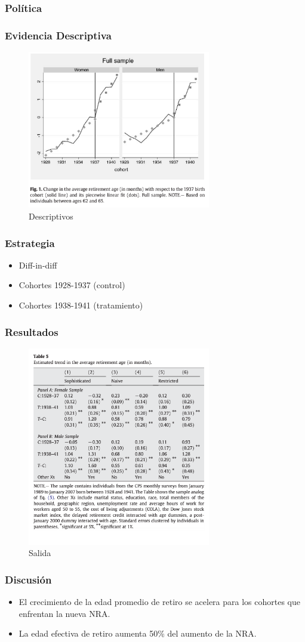 \documentclass{beamer}
\begin{document}
 
  \frame
  {
    \frametitle{Política}
  }
  \frame
  {
    \frametitle{Evidencia Descriptiva}
      \begin{figure}[htp]
        \centering
        \includegraphics[width=8cm]{imgs/mastrobouni-fig1}
        \caption{Descriptivos}
        \label{fig:fig2}
      \end{figure}
  }
  \frame
  {
    \frametitle{Estrategia}
    \begin{itemize}
      \item Diff-in-diff
      \item Cohortes 1928-1937 (control)
      \item Cohortes 1938-1941 (tratamiento)
    \end{itemize}
  }
  \frame
  {
    \frametitle{Resultados}
      \begin{figure}[htp]
        \centering
        \includegraphics[width=8cm]{imgs/mastrobouni-tab5}
        \caption{Salida}
        \label{fig:fig2}
      \end{figure}
  }
  \frame
  {
    \frametitle{Discusión}
    \begin{itemize}
      \item El crecimiento de la edad promedio de retiro se acelera para los cohortes que enfrentan la nueva NRA.
      \item La edad efectiva de retiro aumenta 50\% del aumento de la NRA.
    \end{itemize}
  }
\end{document}
